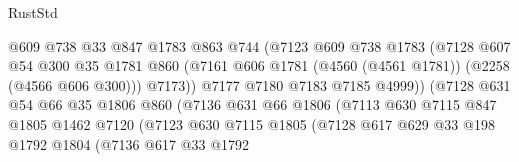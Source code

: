 \begin{lexlean}{RustStd}
\begin{coremodule}
                                  @609
                                  @738
                                  @33
                                  @847
                                  @1783
                                  @863
                                  @744
                                  (@7123
                                    @609
                                    @738
                                    @1783
                                    (@7128
                                      @607
                                      @54
                                      @300
                                      @35
                                      @1781
                                      @860
                                      (@7161
                                        @606
                                        @1781
                                        (@4560 (@4561 @1781))
                                        (@2258 (@4566 @606 @300)))
                                      @7173))
                                  @7177
                                  @7180
                                  @7183
                                  @7185
                                  @4999))
                              (@7128
                                @631
                                @54
                                @66
                                @35
                                @1806
                                @860
                                (@7136
                                  @631
                                  @66
                                  @1806
                                  (@7113
                                    @630
                                    @7115
                                    @847
                                    @1805
                                    @1462
                                    @7120
                                    (@7123
                                      @630
                                      @7115
                                      @1805
                                      (@7128
                                        @617
                                        @629
                                        @33
                                        @198
                                        @1792
                                        @1804
                                        (@7136
                                          @617
                                          @33
                                          @1792

\end{coremodule}
\end{lexlean}
